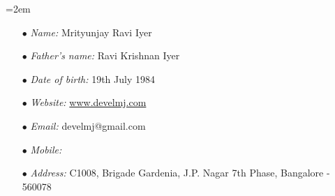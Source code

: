 \documentclass{scrartcl}
\newcommand{\Description}[1]{\hangindent=2em\hangafter=0\noindent\raggedright\footnotesize{#1}\par\normalsize}
\begin{document}
\begin{cv}{
\href{http://www.develmj.com}{}
}
\vspace{1.5em}

\noindent{}
\vspace{0.5em}

\Description{
\begin{itemize}
  \item[\footnotesize$\bullet$] \textsl{Name:} Mrityunjay Ravi Iyer
  \item[\footnotesize$\bullet$] \textsl{Father's name:} Ravi Krishnan Iyer
  \item[\footnotesize$\bullet$] \textsl{Date of birth:} 19th July 1984
  \item[\footnotesize$\bullet$] \textsl{Website:}
    \url{www.develmj.com}
  \item[\footnotesize$\bullet$] \textsl{Email:} develmj@gmail.com
  \item[\footnotesize$\bullet$] \textsl{Mobile:} 
  \item[\footnotesize$\bullet$] \textsl{Address:} C1008, Brigade
    Gardenia, J.P. Nagar 7th Phase, Bangalore - 560078
\end{itemize}
}
\end{cv}
\end{document}
